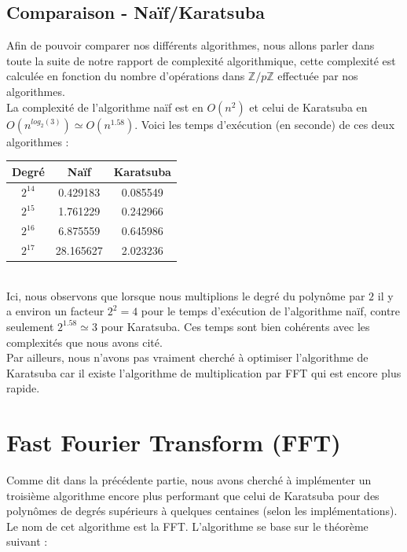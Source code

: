 \documentclass[12pt, a4paper]{article}
\begin{document}
\subsection{Comparaison - Naïf/Karatsuba}
Afin de pouvoir comparer nos différents algorithmes, nous allons parler dans toute la suite de notre rapport de complexité algorithmique, cette complexité est calculée en fonction du nombre d'opérations dans $\mathbb{Z}/p\mathbb{Z}$ effectuée par nos algorithmes. \\
\indent La complexité de l'algorithme naïf est en $O(n^2)$ et celui de Karatsuba en ${O(n^{log_2(3)}) \simeq O(n^{1.58})}$. Voici les temps d'exécution (en seconde) de ces deux algorithmes :
\begin{center}
\begin{tabular}{||c c c||}
\hline
Degré & Naïf & Karatsuba \\
\hline\hline
$2^{14}$ & 0.429183 & 0.085549 \\
\hline
$2^{15}$ & 1.761229 & 0.242966 \\
\hline
$2^{16}$ & 6.875559 & 0.645986 \\
\hline
$2^{17}$ & 28.165627 & 2.023236 \\
\hline
\end{tabular}
\end{center}
{}
\ \\
\indent Ici, nous observons que lorsque nous multiplions le degré du polynôme par $2$ il y a environ un facteur $2^2 = 4$ pour le temps d'exécution de l'algorithme naïf, contre seulement $2^{1.58} \simeq 3$ pour Karatsuba. Ces temps sont bien cohérents avec les complexités que nous avons cité. \\
\indent Par ailleurs, nous n'avons pas vraiment cherché à optimiser l'algorithme de Karatsuba car il existe l'algorithme de multiplication par FFT qui est encore plus rapide.

\newpage

\section{Fast Fourier Transform (FFT)}

Comme dit dans la précédente partie, nous avons cherché à implémenter un troisième algorithme encore plus performant que celui de Karatsuba pour des polynômes de degrés supérieurs à quelques centaines (selon les implémentations). Le nom de cet algorithme est la FFT. L'algorithme se base sur le théorème suivant :
\end{document}
